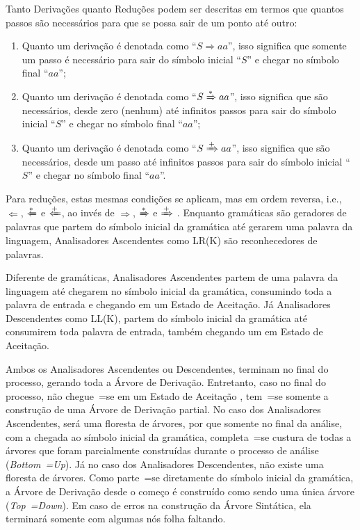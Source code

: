 Tanto Derivações quanto Reduções podem ser descritas em termos que quantos passos são necessários para que se possa sair de um ponto até outro:
\begin{enumerate}%
    \item Quanto um derivação é denotada como ``$S \Rightarrow a a $'',
    isso significa que somente um passo é necessário para sair do símbolo inicial ``$S$'' e
    chegar no símbolo final ``$a a$'';
    \item Quanto um derivação é denotada como ``$S \xRightarrow{*} a a $'',
    isso significa que são necessários,
    desde zero (nenhum) até infinitos passos para sair do símbolo inicial ``$S$'' e
    chegar no símbolo final ``$a a$'';
    \item Quanto um derivação é denotada como ``$S \xRightarrow{+} a a $'',
    isso significa que são necessários,
    desde um passo até infinitos passos para sair do símbolo inicial ``$S$'' e
    chegar no símbolo final ``$a a$''.
\end{enumerate}

Para reduções,
estas mesmas condições se aplicam,
mas em ordem reversa,
i.e., $\Leftarrow$, $\xLeftarrow{*}$ e $\xLeftarrow{+}$,
ao invés de $\Rightarrow$,
$\xRightarrow{*}$ e
$\xRightarrow{+}$ \cite{ahoCompilerDragonBook}.
Enquanto gramáticas são geradores de palavras que partem do símbolo inicial da gramática até gerarem uma palavra da linguagem,
Analisadores Ascendentes como LR(K) são reconhecedores de palavras.

Diferente de gramáticas,
Analisadores Ascendentes partem de uma palavra da linguagem até chegarem no símbolo inicial da gramática,
consumindo toda a palavra de entrada e
chegando em um Estado de Aceitação.
Já Analisadores Descendentes como LL(K),
partem do símbolo inicial da gramática até consumirem toda palavra de entrada,
também chegando um em Estado de Aceitação.

Ambos os Analisadores Ascendentes ou
Descendentes,
terminam no final do processo,
gerando toda a Árvore de Derivação.
Entretanto,
caso no final do processo,
não chegue~=se em um Estado de Aceitação \cite{ahoCompilerDragonBook},
tem~=se somente a construção de uma Árvore de Derivação partial.
No caso dos Analisadores Ascendentes,
será uma floresta de árvores,
por que somente no final da análise,
com a chegada ao símbolo inicial da gramática,
completa~=se custura de todas a árvores que foram parcialmente construídas durante o processo de análise (\textit{Bottom~=Up}).
Já no caso dos Analisadores Descendentes,
não existe uma floresta de árvores.
Como parte~=se diretamente do símbolo inicial da gramática,
a Árvore de Derivação desde o começo é construído como sendo uma única árvore (\textit{Top~=Down}).
Em caso de erros na construção da Árvore Sintática,
ela terminará somente com algumas nós folha faltando.



